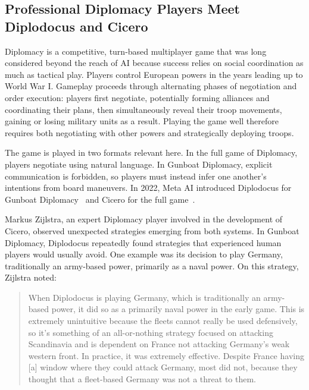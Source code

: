\subsection{Professional Diplomacy Players Meet Diplodocus and Cicero~\citep{bakhtin2022masteringgamenopressdiplomacy, meta2022humandiplomacy}}
\label{sec:diplomacy}

Diplomacy is a competitive, turn-based multiplayer game that was long considered beyond the reach of AI because success relies on social coordination as much as tactical play. Players control European powers in the years leading up to World War I. Gameplay proceeds through alternating phases of negotiation and order execution: players first negotiate, potentially forming alliances and coordinating their plans, then simultaneously reveal their troop movements, gaining or losing military units as a result. Playing the game well therefore requires both negotiating with other powers and strategically deploying troops.

The game is played in two formats relevant here. In the full game of Diplomacy, players negotiate using natural language. In Gunboat Diplomacy, explicit communication is forbidden, so players must instead infer one another's intentions from board maneuvers. In 2022, Meta AI introduced Diplodocus for Gunboat Diplomacy~\citep{bakhtin2022masteringgamenopressdiplomacy} and Cicero for the full game~\citep{meta2022humandiplomacy}.

Markus Zijlstra, an expert Diplomacy player involved in the development of Cicero, observed unexpected strategies emerging from both systems. In Gunboat Diplomacy, Diplodocus repeatedly found strategies that experienced human players would usually avoid. One example was its decision to play Germany, traditionally an army-based power, primarily as a naval power. On this strategy, Zijlstra noted:

\begin{quote}
When Diplodocus is playing Germany, which is traditionally an army-based power, it did so as a primarily naval power in the early game.
This is extremely unintuitive because the fleets cannot really be used defensively, so it's something of an all-or-nothing strategy focused on attacking Scandinavia and is dependent on France not attacking Germany's weak western front.
In practice, it was extremely effective. Despite France having [a] window where they could attack Germany, most did not, because they thought that a fleet-based Germany was not a threat to them.
\end{quote}

